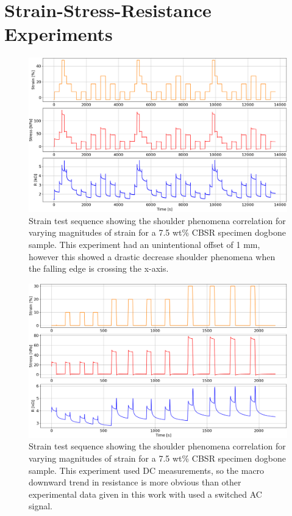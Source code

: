 \chapter{Strain-Stress-Resistance Experiments}
\label{appendix-B}
\begin{figure}[H]
	\centering
	\includegraphics[width=\linewidth]{Figures/2_7-5_E4pin_20mm_v12_0.1_0.2_0.3_strain_1mm_offset_erroneous.png}
	\caption{Strain test sequence showing the shoulder phenomena correlation for varying magnitudes of strain for a 7.5 wt\% CBSR specimen dogbone sample. This experiment had an unintentional offset of 1 mm, however this showed a drastic decrease shoulder phenomena when the falling edge is crossing the x-axis.}
	\label{fig:strain-hill}
\end{figure}
\begin{figure}[H]
	\centering
	\includegraphics[width=\linewidth]{Figures/1_7-5_Epin_20mm_v2_DC_meas_3_strains.png}
	\caption{Strain test sequence showing the shoulder phenomena correlation for varying magnitudes of strain for a 7.5 wt\% CBSR specimen dogbone sample. This experiment used DC measurements, so the macro downward trend in resistance is more obvious than other experimental data given in this work with used a switched AC signal.}
	\label{fig:strain-train-DC-meas}
\end{figure}
